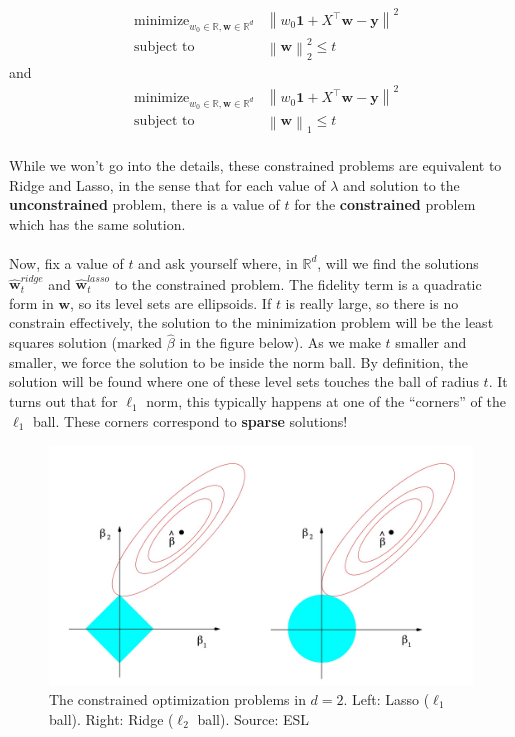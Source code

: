 \documentclass[11pt]{article}
\newcommand{\norm}[1]{\left\| #1\right\|}
\newcommand{\R}{\ensuremath{\mathbb{R}}}
\newcommand{\Tr}{\ensuremath{\top}}
\newcommand{\V}[1]{\mathbf{#1}}
\begin{document}
 \begin{eqnarray*}
  & \text{minimize}_{w_0\in\R,\V{w}\in\R^{d}}   &  \norm{  w_0\mathbf{1} + X^\Tr\V{w} -\V{y}  }^2 \\
      & \text{subject to} &  \norm{\V{w}}_2^2 \leq t
    \end{eqnarray*}
    and
     \begin{eqnarray*}
  & \text{minimize}_{w_0\in\R,\V{w}\in\R^{d}}   &  \norm{  w_0\mathbf{1} + X^\Tr\V{w} -\V{y}  }^2 \\
      & \text{subject to} &  \norm{\V{w}}_1 \leq t
    \end{eqnarray*}
~\\
    While we won't go into the details, these constrained problems are
    equivalent to Ridge and Lasso, in the sense that for each value of $\lambda$
    and solution to the {\bf unconstrained} problem, there is a value of $t$ for
    the {\bf constrained} problem which has the same solution.
 \\~\\
    Now, fix a value of $t$ and ask yourself where, in $\R^d$, will we find the
    solutions $\hat{\V{w}}^{ridge}_t$ and $\hat{\V{w}}^{lasso}_t$ 
    to the constrained problem. The fidelity term is a quadratic form
    in $\V{w}$, so its level sets are ellipsoids.
    If $t$ is really large, so there is no constrain effectively, the solution
    to the minimization problem will be the least squares solution (marked
    $\hat{\beta}$ in the figure below). As we make $t$ smaller and smaller, we
    force the solution to be inside the norm ball.
    By definition, the 
    solution will be found where one of these level sets touches the ball of
    radius $t$. It turns out that for $\ell_1$ norm, this typically happens at
    one of the ``corners'' of the $\ell_1$ ball. These corners correspond to
    {\bf sparse} solutions!

     \begin{figure}[H]
      \centering
      \includegraphics[width=5in]{l1_l2_balls.jpeg}
      \caption{The constrained optimization problems in $d=2$. Left: Lasso
        ($\ell_1$ ball). Right: Ridge ($\ell_2$ ball).
      Source: ESL}
    \end{figure}
\end{document}
